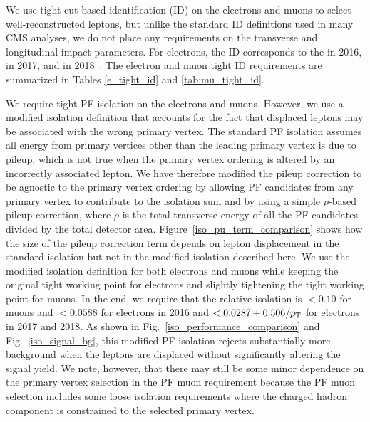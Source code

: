 



We use tight cut-based identification (ID) on the electrons and muons to select well-reconstructed leptons, but unlike the standard ID definitions used in many CMS analyses, we do not place any requirements on the transverse and longitudinal impact parameters. For electrons, the ID corresponds to the  in 2016,  in 2017, and  in 2018~\cite{egammaPOGtightID}. The electron and muon tight ID requirements are summarized in Tables \ref{e_tight_id} and \ref{tab:mu_tight_id}.




We require tight PF isolation on the electrons and muons. However, we use a modified isolation definition that accounts for the fact that displaced leptons may be associated with the wrong primary vertex. The standard PF isolation assumes all energy from primary vertices other than the leading primary vertex is due to pileup, which is not true when the primary vertex ordering is altered by an incorrectly associated lepton. We have therefore modified the pileup correction to be agnostic to the primary vertex ordering by allowing PF candidates from any primary vertex to contribute to the isolation sum and by using a simple $\rho$-based pileup correction, where $\rho$ is the total transverse energy of all the PF candidates divided by the total detector area. Figure~\ref{iso_pu_term_comparison} shows how the size of the pileup correction term depends on lepton displacement in the standard isolation but not in the modified isolation described here. We use the modified isolation definition for both electrons and muons while keeping the original tight working point for electrons and slightly tightening the tight working point for muons. In the end, we require that the relative isolation is $<0.10$ for muons and $<0.0588$ for electrons in 2016 and $<0.0287+0.506/p_{\mathrm{T}}$ for electrons in 2017 and 2018. As shown in Fig.~\ref{iso_performance_comparison} and Fig.~\ref{iso_signal_bg}, this modified PF isolation rejects substantially more background when the leptons are displaced without significantly altering the signal yield. We note, however, that there may still be some minor dependence on the primary vertex selection in the PF muon requirement because the PF muon selection includes some loose isolation requirements where the charged hadron component is constrained to the selected primary vertex.

